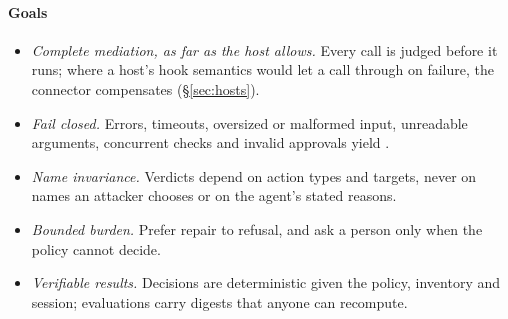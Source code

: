 \paragraph{Goals}
\begin{itemize}
\item[G1] \emph{Complete mediation, as far as the host allows.} Every call is judged before it runs; where a host's hook semantics would let a call through on failure, the connector compensates (\S\ref{sec:hosts}).
\item[G2] \emph{Fail closed.} Errors, timeouts, oversized or malformed input, unreadable arguments, concurrent checks and invalid approvals yield .
\item[G3] \emph{Name invariance.} Verdicts depend on action types and targets, never on names an attacker chooses or on the agent's stated reasons.
\item[G4] \emph{Bounded burden.} Prefer repair to refusal, and ask a person only when the policy cannot decide.
\item[G5] \emph{Verifiable results.} Decisions are deterministic given the policy, inventory and session; evaluations carry digests that anyone can recompute.
\end{itemize}
